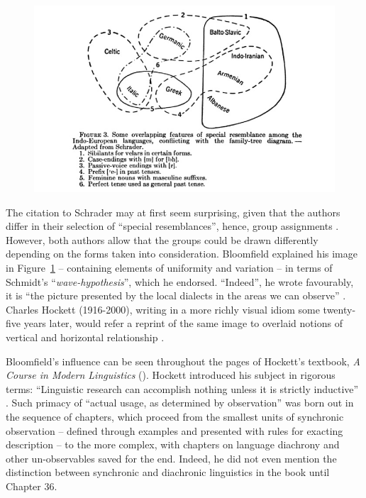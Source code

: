\documentclass[output=paper]{langscibook}
\begin{document}
\begin{figure}
    \centering
    \includegraphics[scale=1]{figures/bloomfield1933-316.png}
    \caption{\citet[316]{Bloomfield1933}}
    \label{fig:kaplan:bloomfield316}
\end{figure}

The citation to Schrader may at first seem surprising, given that the authors differ in their selection of ``special resemblances'', hence, group assignments \citep[317]{Bloomfield1933}. However, both authors allow that the groups could be drawn differently depending on the forms taken into consideration. Bloomfield explained his image in Figure~\ref{fig:kaplan:bloomfield316} – containing elements of uniformity and variation – in terms of Schmidt's ``\emph{wave-hypothesis}'', which he endorsed. ``Indeed'', he wrote favourably, it is ``the picture presented by the local dialects in the areas we can observe'' \citep[317]{Bloomfield1933}. Charles Hockett (1916-2000), writing in a more richly visual idiom some twenty-five years later, would refer a reprint of the same image to overlaid notions of vertical and horizontal relationship \citep[cf.][]{Huebschmann1875}.

Bloomfield's influence can be seen throughout the pages of Hockett's textbook, \emph{A Course in Modern Linguistics} (\citeyear{Hockett19591958}). Hockett introduced his subject in rigorous terms: ``Linguistic research can accomplish nothing unless it is strictly inductive'' \citep[7]{Hockett19591958}. Such primacy of ``actual usage, as determined by observation'' was born out in the sequence of chapters, which proceed from the smallest units of synchronic observation – defined through examples and presented with rules for exacting description – to the more complex, with chapters on language diachrony and other un-observables saved for the end. Indeed, he did not even mention the distinction between synchronic and diachronic linguistics in the book until Chapter 36.
\end{document}
